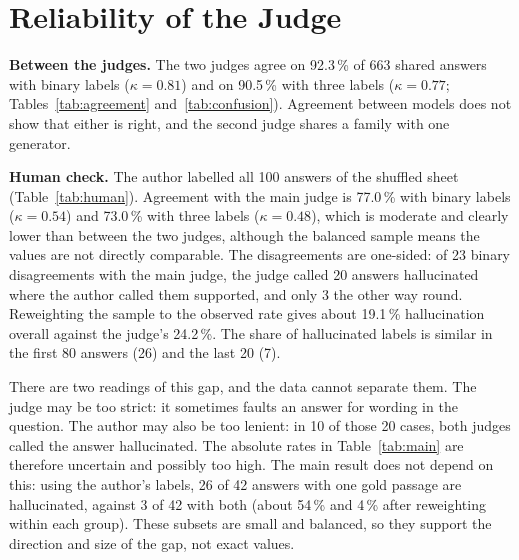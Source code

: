 \section{Reliability of the Judge}\label{sec:res-judge}

\begin{table}[htbp]
\centering\small
\caption{Agreement between \texttt{gemma-4-31b-it} and \texttt{openai/gpt-oss-120b}.}\label{tab:agreement}

\end{table}

\begin{table}[htbp]
\centering\small
\caption{Labels of the two judges (rows: main judge; columns: second judge).}\label{tab:confusion}

\end{table}

\begin{table}[htbp]
\centering\small
\caption{Agreement of each judge with the manual labels of the author. The sample is balanced by the main judge's
verdict, so these values are not an accuracy estimate for all answers.}\label{tab:human}

\end{table}

\textbf{Between the judges.} The two judges agree on 92.3\,\% of 663 shared answers with binary labels ($\kappa=0.81$)
and on 90.5\,\% with three labels ($\kappa=0.77$; Tables~\ref{tab:agreement} and~\ref{tab:confusion}). Agreement between
models does not show that either is right, and the second judge shares a family with one generator.

\textbf{Human check.} The author labelled all 100 answers of the shuffled sheet (Table~\ref{tab:human}). Agreement
with the main judge is 77.0\,\% with binary labels ($\kappa=0.54$) and 73.0\,\% with three labels ($\kappa=0.48$), which
is moderate and clearly lower than between the two judges, although the balanced sample means the values are not
directly comparable. The disagreements are one-sided: of 23 binary disagreements with the main judge, the judge called
20 answers hallucinated where the author called them supported, and only 3 the other way round. Reweighting the
sample to the observed rate gives about 19.1\,\% hallucination overall against the judge's 24.2\,\%. The share
of hallucinated labels is similar in the first 80 answers (26) and the last 20 (7).

There are two readings of this gap, and the data cannot separate them. The judge may be too strict: it sometimes
faults an answer for wording in the question. The author may also be too lenient: in 10 of those 20 cases, both judges
called the answer hallucinated. The absolute rates in Table~\ref{tab:main} are therefore
uncertain and possibly too high. The main result does not depend on this: using the author's labels, 26 of 42 answers
with one gold passage are hallucinated, against 3 of 42 with both (about 54\,\% and 4\,\% after reweighting within each
group). These subsets are small and balanced, so they support the direction and size of the gap, not exact values.

